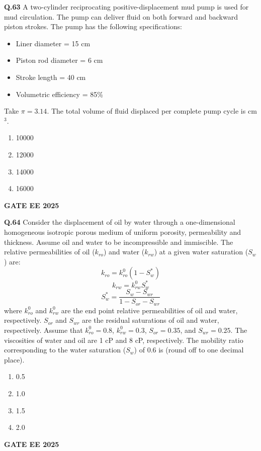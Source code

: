 \documentclass{article}
\begin{document}
\textbf{Q.63} A two-cylinder reciprocating positive-displacement mud pump is used for mud circulation. The pump can deliver fluid on both forward and backward piston strokes. The pump has the following specifications:
\begin{itemize}
\item Liner diameter = 15 cm
\item Piston rod diameter = 6 cm
\item Stroke length = 40 cm
\item Volumetric efficiency = 85\%
\end{itemize}
Take $\pi = 3.14$. The total volume of fluid displaced per complete pump cycle is \underline{\hspace{1cm}} cm$^3$.
\begin{enumerate}[label=(\Alph*)]
    \item 10000
    \item 12000
    \item 14000
    \item 16000
\end{enumerate}
\textbf{GATE EE 2025}

\vspace{0.5cm}

\textbf{Q.64} Consider the displacement of oil by water through a one-dimensional homogeneous isotropic porous medium of uniform porosity, permeability and thickness. Assume oil and water to be incompressible and immiscible. The relative permeabilities of oil ($k_{ro}$) and water ($k_{rw}$) at a given water saturation ($S_w$) are:
\[
k_{ro} = k_{ro}^0 (1 - S_w^*)
\]
\[
k_{rw} = k_{rw}^0 S_w^*
\]
\[
S_w^* = \frac{S_w - S_{wr}}{1 - S_{or} - S_{wr}}
\]
where $k_{ro}^0$ and $k_{rw}^0$ are the end point relative permeabilities of oil and water, respectively. $S_{or}$ and $S_{wr}$ are the residual saturations of oil and water, respectively. Assume that $k_{ro}^0 = 0.8$, $k_{rw}^0 = 0.3$, $S_{or} = 0.35$, and $S_{wr} = 0.25$. The viscosities of water and oil are 1 cP and 8 cP, respectively. The mobility ratio corresponding to the water saturation ($S_w$) of 0.6 is \underline{\hspace{1cm}} (round off to one decimal place).
\begin{enumerate}[label=(\Alph*)]
    \item 0.5
    \item 1.0
    \item 1.5
    \item 2.0
\end{enumerate}
\textbf{GATE EE 2025}
\end{document}
